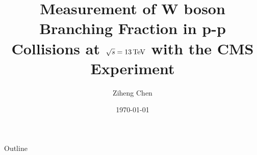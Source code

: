 \documentclass[xcolor=dvipsnames, 10pt]{beamer}
\title[\BWl measurement]{Measurement of W boson Branching Fraction in p-p Collisions at $\sqrt{s} = 13\,\text{Te\hspace{-.08em}V}$  with the CMS Experiment}
\date{\today}
\author[Z. Chen]{Ziheng Chen}
\institute[NWU]{Department of Physics and Astronomy, \\ Northwestern University}
\begin{document}
\begin{frame}{} \titlepage \end{frame}

\begin{frame}{Outline}
\setcounter{tocdepth}{1}
\tableofcontents
\end{frame}










\appendix



\begin{frame}[allowframebreaks]
    \tiny{
    
    
    }
\end{frame}
\end{document}
